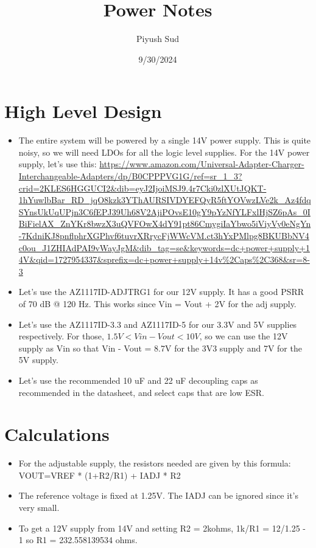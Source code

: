 \documentclass[12pt, letterpaper]{article}
\title{Power Notes}
\author{Piyush Sud}
\date{9/30/2024}
\begin{document}
\maketitle

\pagebreak

\section{High Level Design}

\begin{itemize}
    \item The entire system will be powered by a single 14V power supply. This is quite noisy, so we will need LDOs for all the logic level supplies. For the 14V power supply, let's use this: \url{https://www.amazon.com/Universal-Adapter-Charger-Interchangeable-Adapters/dp/B0CPPPVG1G/ref=sr_1_3?crid=2KLES6HGGUCI2&dib=eyJ2IjoiMSJ9.4r7Cki0zlXUtJQKT-1hYuwlbBar_RD_jqO8kzk3YThAURSIVDYEFQyR5ftYOVwzLVe2k_Az4fdqSYnsUkUqUPjn3C6fEPJ39Uh68V2AjiPOvsE10gY9pYzNfYLFxlHjSZ6pAs_0IBiFielAX_ZnYKr8bwzX3uQVFOwX4dY91pt86CmygiIaYbwo5iViyVy0eNgYn-7KdniKJ8pnflphrXGPhvf6tuvrXRrycFjWWcVM.ct3hYxPMlpg8BKUBbNV4c0ou_J1ZHIAdPAI9vWayJgM&dib_tag=se&keywords=dc+power+supply+14V&qid=1727954337&sprefix=dc+power+supply+14v%2Caps%2C368&sr=8-3}
    \item Let's use the AZ1117ID-ADJTRG1 for our 12V supply. It has a good PSRR of 70 dB @ 120 Hz. This works since Vin = Vout + 2V for the adj supply.
    \item Let's use the AZ1117ID-3.3 and AZ1117ID-5 for our 3.3V and 5V supplies respectively. For those, \(1.5V < Vin - Vout < 10V\), so we can use the 12V supply as Vin so that Vin - Vout = 8.7V for the 3V3 supply and 7V for the 5V supply. 
    \item Let's use the recommended 10 uF and 22 uF decoupling caps as recommended in the datasheet, and select caps that are low ESR.
\end{itemize}

\section{Calculations}

\begin{itemize}
    \item For the adjustable supply, the resistors needed are given by this formula: VOUT=VREF * (1+R2/R1) + IADJ * R2
    \item The reference voltage is fixed at 1.25V. The IADJ can be ignored since it's very small.
    \item To get a 12V supply from 14V and setting R2 = 2kohms, 1k/R1 = 12/1.25 - 1 so R1 = 232.558139534 ohms.
\end{itemize}
\end{document}
